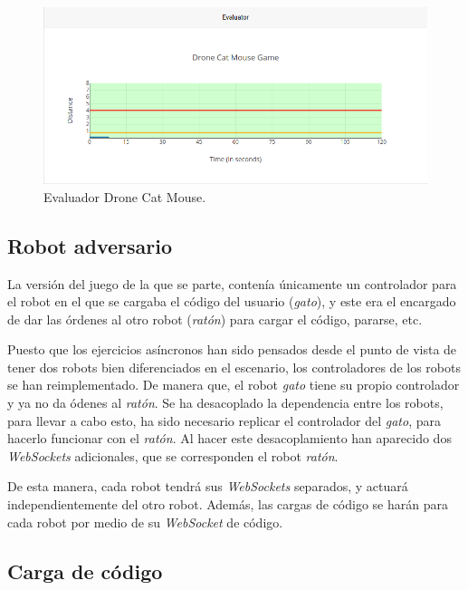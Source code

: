 \documentclass[a4paper, 12pt]{book}
\begin{document}
\begin{figure}[H]
	\centering
    \includegraphics[width=15cm]{img/evaluator_drone_cat_mouse.png}
    \caption{Evaluador Drone Cat Mouse.}
    \label{figura:evaluator_drone}
\end{figure}

\subsection{Robot adversario}
\label{drone_cat_mouse_adversario}

La versión del juego de la que se parte, contenía únicamente un controlador para el robot en el que se cargaba el código del usuario (\emph{gato}), y este era el encargado de dar las órdenes al otro robot (\emph{ratón}) para cargar el código, pararse, etc.

Puesto que los ejercicios asíncronos han sido pensados desde el punto de vista de tener dos robots bien diferenciados en el escenario, los controladores de los robots se han reimplementado. De manera que, el robot \emph{gato} tiene su propio controlador y ya no da ódenes al \emph{ratón}. Se ha desacoplado la dependencia entre los robots, para llevar a cabo esto, ha sido necesario replicar el controlador del \emph{gato}, para hacerlo funcionar con el \emph{ratón}. Al hacer este desacoplamiento han aparecido dos \emph{WebSockets} adicionales, que se corresponden el robot \emph{ratón}. 

De esta manera, cada robot tendrá sus \emph{WebSockets} separados, y actuará independientemente del otro robot. Además, las cargas de código se harán para cada robot por medio de su \emph{WebSocket} de código.

\subsection{Carga de código}
\label{drone_cat_mouse_code_load}
\end{document}
